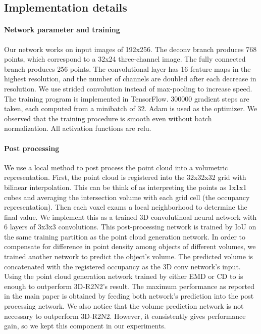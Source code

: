 \documentclass[10pt,twocolumn,letterpaper]{article}
\begin{document}
\subsection{Implementation details}\label{sec:impl_details}\paragraph{Network parameter and training}
Our network works on input images of 192x256. The deconv branch produces 768 points, which correspond to a 32x24 three-channel image. The fully connected branch produces 256 points. The convolutional layer has 16 feature maps in the highest resolution, and the number of channels are doubled after each decrease in resolution. We use strided convolution instead of max-pooling to increase speed. The training program is implemented in TensorFlow. 300000 gradient steps are taken, each computed from a minibatch of 32. Adam is used as the optimizer. We observed that the training procedure is smooth even without batch normalization. All activation functions are relu.

\paragraph{Post processing}
We use a local method to post process the point cloud into a volumetric representation. First, the point cloud is registered into the 32x32x32 grid with bilinear interpolation. This can be think of as interpreting the points as 1x1x1 cubes and averaging the intersection volume with each grid cell (the occupancy representation). Then each voxel exams a local neighborhood to determine the final value. We implement this as a trained 3D convolutinoal neural network with 6 layers of 3x3x3 convolutions. This post-processing network is trained by IoU on the same training partition as the point cloud generation network. In order to compensate for difference in point density among objects of different volumes, we trained another network to predict the object's volume. The predicted volume is concatenated with the registered occupancy as the 3D conv network's input. Using the point cloud generation network trained by either EMD or CD to is enough to outperform 3D-R2N2's result. The maximum performance as reported in the main paper is obtained by feeding both     network's prediction into the post processing network. We also notice that the volume prediction network is not necessary to outperform 3D-R2N2. However, it consistently gives performance gain, so we kept this component in our experiments.
\end{document}
